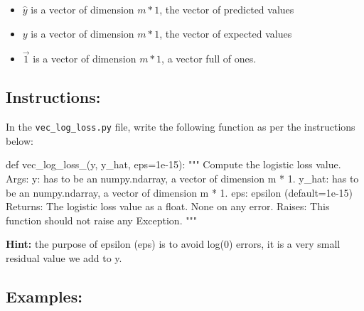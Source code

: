 \documentclass[]{article}
\newenvironment{Shaded}{\begin{snugshade}}{\end{snugshade}}
\newcommand{\CommentTok}[1]{\textcolor[rgb]{0.48,0.49,0.49}{#1}}
\newcommand{\FloatTok}[1]{\textcolor[rgb]{0.96,0.45,0.00}{#1}}
\newcommand{\KeywordTok}[1]{\textcolor[rgb]{0.81,0.81,0.76}{#1}}
\newcommand{\NormalTok}[1]{\textcolor[rgb]{0.81,0.81,0.76}{#1}}
\newcommand{\OperatorTok}[1]{\textcolor[rgb]{0.81,0.81,0.76}{#1}}
\begin{document}
\begin{itemize}
\item
  \(\hat{y}\) is a vector of dimension \(m * 1\), the vector of
  predicted values
\item
  \(y\) is a vector of dimension \(m * 1\), the vector of expected
  values
\item
  \(\vec{1}\) is a vector of dimension \(m * 1\), a vector full of ones.
\end{itemize}

\hypertarget{instructions-5}{%
\subsection{Instructions:}\label{instructions-5}}

In the \texttt{vec\_log\_loss.py} file, write the following function as
per the instructions below:

\begin{Shaded}
\begin{Highlighting}[]
\KeywordTok{def}\NormalTok{ vec_log_loss_(y, y_hat, eps}\OperatorTok{=}\FloatTok{1e-15}\NormalTok{):}
    \CommentTok{"""}
\CommentTok{    Compute the logistic loss value.}
\CommentTok{    Args:}
\CommentTok{        y: has to be an numpy.ndarray, a vector of dimension m * 1.}
\CommentTok{        y_hat: has to be an numpy.ndarray, a vector of dimension m * 1.}
\CommentTok{        eps: epsilon (default=1e-15)}
\CommentTok{    Returns:}
\CommentTok{        The logistic loss value as a float.}
\CommentTok{        None on any error.}
\CommentTok{    Raises:}
\CommentTok{        This function should not raise any Exception.}
\CommentTok{    """}
\end{Highlighting}
\end{Shaded}

\textbf{Hint:} the purpose of epsilon (eps) is to avoid log(0) errors,
it is a very small residual value we add to y.

\hypertarget{examples-5}{%
\subsection{Examples:}\label{examples-5}}
\end{document}
